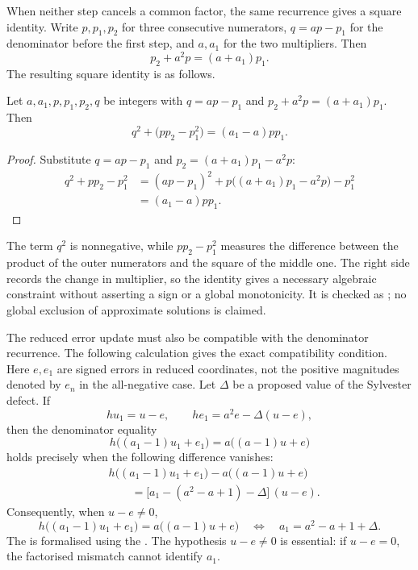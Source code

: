 When neither step cancels a common factor, the same recurrence gives
a square identity. Write $p,p_1,p_2$ for three consecutive numerators,
$q=ap-p_1$ for the denominator before the first step, and $a,a_1$ for
the two multipliers. Then
\[
 p_2+a^2p=(a+a_1)p_1.
\]
The resulting square identity is as follows.

\begin{theorem}\label{long243:res:curvature}
Let $a,a_1,p,p_1,p_2,q$ be integers with $q=ap-p_1$ and
$p_2+a^2p=(a+a_1)p_1$.  Then
\[
 q^2+\bigl(pp_2-p_1^2\bigr)=(a_1-a)pp_1.
\]
\end{theorem}

\begin{proof}
Substitute $q=ap-p_1$ and $p_2=(a+a_1)p_1-a^2p$:
\[
 \begin{aligned}
 q^2+pp_2-p_1^2
 &=(ap-p_1)^2+p\bigl((a+a_1)p_1-a^2p\bigr)-p_1^2\\
 &=(a_1-a)pp_1.
 \end{aligned}
\]
\end{proof}

The term $q^2$ is nonnegative, while $pp_2-p_1^2$ measures the difference
between the product of the outer numerators and the square of the middle one.  The right side records the change in multiplier, so the
identity gives a necessary algebraic constraint without
asserting a sign or a global monotonicity.  It is checked as
; no global exclusion of approximate solutions is
claimed.

The reduced error update must also be compatible with the denominator
recurrence. The following calculation gives the exact compatibility
condition.
Here $e,e_1$ are signed errors in reduced coordinates, not the positive
magnitudes denoted by $e_n$ in the all-negative case. Let $\Delta$ be a
proposed value of the Sylvester defect. If
\[
 hu_1=u-e,
 \qquad he_1=a^2e-\Delta(u-e),
\]
then the denominator equality
\[
 h\bigl((a_1-1)u_1+e_1\bigr)
   =a\bigl((a-1)u+e\bigr)
\]
holds precisely when the following difference vanishes:
\[
 \begin{aligned}
 &h\bigl((a_1-1)u_1+e_1\bigr)-a\bigl((a-1)u+e\bigr)\\
 &\qquad=\bigl[a_1-(a^2-a+1)-\Delta\bigr]\,(u-e).
 \end{aligned}
\]
Consequently, when $u-e\ne0$,
\[
 h\bigl((a_1-1)u_1+e_1\bigr)
   =a\bigl((a-1)u+e\bigr)
 \quad\Longleftrightarrow\quad
 a_1=a^2-a+1+\Delta.
\]
The
is formalised using the
.  The hypothesis $u-e\ne0$ is essential: if
$u-e=0$, the factorised mismatch cannot identify $a_1$.

